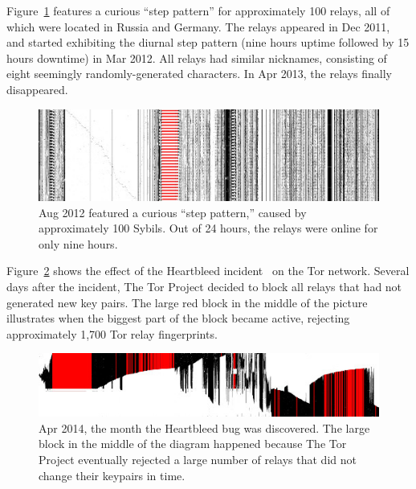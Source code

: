 Figure~\ref{fig:2012-08-steppattern} features a curious ``step pattern'' for
approximately 100 relays, all of which were located in Russia and Germany.  The
relays appeared in Dec 2011, and started exhibiting the diurnal step
pattern (nine hours uptime followed by 15 hours downtime) in Mar 2012.  All
relays had similar nicknames, consisting of eight seemingly randomly-generated
characters.  In Apr 2013, the relays finally disappeared.

\begin{figure}[t]
	\centering
	\includegraphics[width=\linewidth]{diagrams/2012-08.jpg}
	\caption{Aug 2012 featured a curious ``step pattern,'' caused by
	approximately 100 Sybils.  Out of 24 hours, the relays were online for only
	nine hours.}
	\label{fig:2012-08-steppattern}
\end{figure}

Figure~\ref{fig:2014-04-heartbleed} shows the effect of the Heartbleed
incident~\cite{Durumeric2014a} on the Tor network.  Several days after the
incident, The Tor Project decided to block all relays that had not generated new
key pairs.  The large red block in the middle of the picture illustrates when
the biggest part of the block became active, rejecting approximately 1,700 Tor
relay fingerprints.

\begin{figure}[t]
	\centering
	\includegraphics[width=\linewidth]{diagrams/2014-04.jpg}
	\caption{Apr 2014, the month the Heartbleed bug was discovered.
		The large block in the middle of the diagram happened because The
		Tor Project eventually rejected a large number of relays that did not
		change their keypairs in time.}
		\label{fig:2014-04-heartbleed}
\end{figure}

